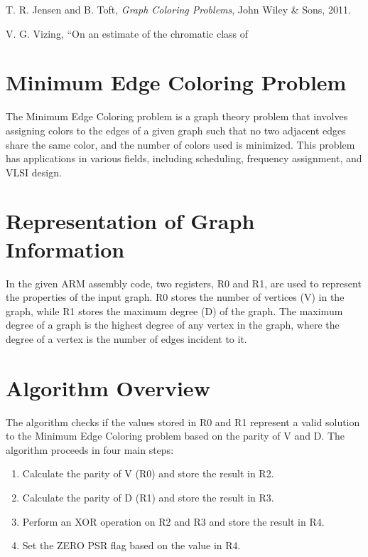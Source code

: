 \begin{thebibliography}{9}

T. R. Jensen and B. Toft, \emph{Graph Coloring Problems}, John Wiley \& Sons, 2011.

V. G. Vizing, “On an estimate of the chromatic class of

\section{Minimum Edge Coloring Problem}

The Minimum Edge Coloring problem is a graph theory problem that involves assigning colors to the edges of a given graph such that no two adjacent edges share the same color, and the number of colors used is minimized. This problem has applications in various fields, including scheduling, frequency assignment, and VLSI design.

\section{Representation of Graph Information}

In the given ARM assembly code, two registers, R0 and R1, are used to represent the properties of the input graph. R0 stores the number of vertices (V) in the graph, while R1 stores the maximum degree (D) of the graph. The maximum degree of a graph is the highest degree of any vertex in the graph, where the degree of a vertex is the number of edges incident to it.

\section{Algorithm Overview}

The algorithm checks if the values stored in R0 and R1 represent a valid solution to the Minimum Edge Coloring problem based on the parity of V and D. The algorithm proceeds in four main steps:

\begin{enumerate}
    \item Calculate the parity of V (R0) and store the result in R2.
    \item Calculate the parity of D (R1) and store the result in R3.
    \item Perform an XOR operation on R2 and R3 and store the result in R4.
    \item Set the ZERO PSR flag based on the value in R4.
\end{enumerate}


\end{thebibliography}
